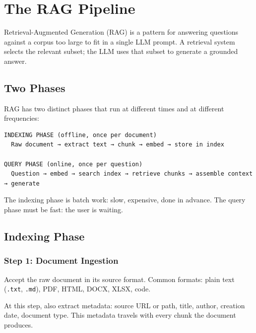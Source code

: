 \chapter{The RAG Pipeline}
\label{ch:rag-pipeline}

Retrieval-Augmented Generation (RAG) is a pattern for answering questions against a corpus
too large to fit in a single LLM prompt. A retrieval system selects the relevant subset; the
LLM uses that subset to generate a grounded answer.

\section{Two Phases}

RAG has two distinct phases that run at different times and at different frequencies:

\begin{Verbatim}
INDEXING PHASE (offline, once per document)
  Raw document → extract text → chunk → embed → store in index

QUERY PHASE (online, once per question)
  Question → embed → search index → retrieve chunks → assemble context → generate
\end{Verbatim}

The indexing phase is batch work: slow, expensive, done in advance. The query phase must be
fast: the user is waiting.

\section{Indexing Phase}

\subsection{Step 1: Document Ingestion}

Accept the raw document in its source format. Common formats: plain text (\texttt{.txt},
\texttt{.md}), PDF, HTML, DOCX, XLSX, code.

At this step, also extract metadata: source URL or path, title, author, creation date,
document type. This metadata travels with every chunk the document produces.

